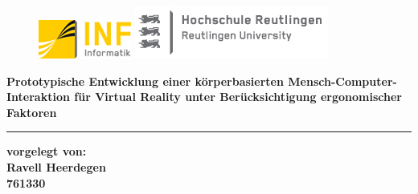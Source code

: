 \begin{titlepage}

\begin{center}

\begin{figure}
\begin{minipage}[H]{4cm}
\centering
\includegraphics[width=0.8\linewidth]{Bilder/Deckblatt/UniversityLogo}
\end{minipage}
\hfill
\begin{minipage}[H]{6cm}
\centering
\includegraphics[width=1\linewidth]{Bilder/Deckblatt/CompanyLogo}
\end{minipage}
\end{figure}



\vspace*{0.8cm}

\begin{doublespace}\textbf{{\large {\Large Prototypische Entwicklung einer körperbasierten Mensch-Computer-\break Interaktion für Virtual Reality unter Berücksichtigung ergonomischer Faktoren}}}\\
\end{doublespace}

\noindent\rule{\textwidth}{2pt}
\vspace*{0.6cm}

\textbf{vorgelegt von:\\}
{\large \textbf{Ravell Heerdegen\\}}
\textbf{761330\\}


\end{center}
\end{titlepage}
